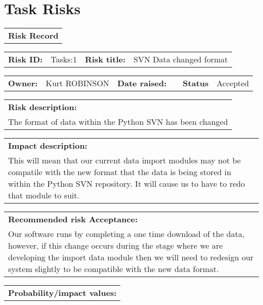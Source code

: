 \section{Task Risks}
\label{Task_Risks}

\FloatBarrier

\begin{table}
	\begin{tabularx}{\textwidth}{| X |}
		\hline
		\textbf{Risk Record} \\
	\end{tabularx}
	\begin{tabularx}{\textwidth}{| l | X | l | X |}
		\hline
		\textbf{Risk ID:} & Tasks:1 & \textbf{Risk title:} & SVN Data changed format \\
	\end{tabularx}
	\begin{tabularx}{\textwidth}{| l | X | l | X | l | X |}
		\hline
		\textbf{Owner:} & Kurt ROBINSON & \textbf{Date raised:} &  & \textbf{Status} & Accepted \\
	\end{tabularx}
	\begin{tabularx}{\textwidth}{| X |}
		\hline
		\textbf{Risk description:} \\ The format of data within the Python SVN has been changed  \\
	\end{tabularx}
	\begin{tabularx}{\textwidth}{| X |}
		\hline
		\textbf{Impact description:} \\ This will mean that our current data import modules may not be compatile with the new format that the data is being stored in within the Python SVN repository. It will cause us to have to redo that module to suit. \\
	\end{tabularx}
	\begin{tabularx}{\textwidth}{| X |}
		\hline
		\textbf{Recommended risk Acceptance:} \\ Our software runs by completing a one time download of the data, however, if this change occurs during the stage where we are developing the import data module then we will need to redesign our system slightly to be compatible with the new data format. \\
	\end{tabularx}
	\begin{tabularx}{\textwidth}{| X |}
		\hline
		\textbf{Probability/impact values:} \\

\end{tabularx}
\end{table}
